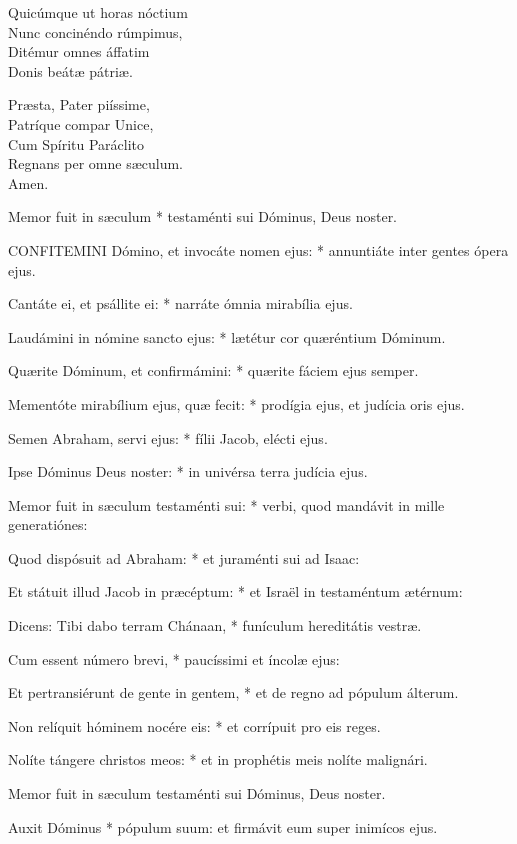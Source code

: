 Quicúmque ut horas nóctium\\
Nunc concinéndo rúmpimus,\\
Ditémur omnes áffatim\\
Donis beátæ pátriæ.

Præsta, Pater piíssime,\\
Patríque compar Unice,\\
Cum Spíritu Paráclito\\
Regnans per omne sæculum.\\
Amen.


 Memor fuit in sæculum * testaménti sui Dóminus, Deus noster.


\lettrine[lines=2]{C}{ONFITEMINI} Dómino, et invocáte nomen ejus: * annuntiáte inter gentes ópera ejus.

Cantáte ei, et psállite ei: * narráte ómnia mirabília ejus.

Laudámini in nómine sancto ejus: * lætétur cor quæréntium Dóminum.

Quærite Dóminum, et confirmámini: * quærite fáciem ejus semper.

Mementóte mirabílium ejus, quæ fecit: * prodígia ejus, et judícia oris ejus.

Semen Abraham, servi ejus: * fílii Jacob, elécti ejus.

Ipse Dóminus Deus noster: * in univérsa terra judícia ejus.

Memor fuit in sæculum testaménti sui: * verbi, quod mandávit in mille generatiónes:

Quod dispósuit ad Abraham: * et juraménti sui ad Isaac:

Et státuit illud Jacob in præcéptum: * et Israël in testaméntum ætérnum:

Dicens: Tibi dabo terram Chánaan, * funículum hereditátis vestræ.

Cum essent número brevi, * paucíssimi et íncolæ ejus:

Et pertransiérunt de gente in gentem, * et de regno ad pópulum álterum.

Non relíquit hóminem nocére eis: * et corrípuit pro eis reges.

Nolíte tángere christos meos: * et in prophétis meis nolíte malignári.

 Memor fuit in sæculum testaménti sui Dóminus, Deus noster.

 Auxit Dóminus * pópulum suum: et firmávit eum super inimícos ejus.

